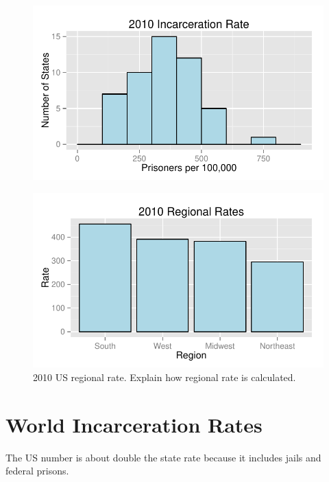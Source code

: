 \documentclass[letterpaper, landscape]{article}
\begin{document}
  \begin{figure}[H]
    \centering
    \includegraphics[scale = 0.8]{figures/rate_histogram_2010.pdf}
  \end{figure}

  \begin{figure}[H]
    \centering
    \includegraphics[scale = 0.8]{figures/regional_rates_2010.pdf}
    \caption{2010 US regional rate.  Explain how regional rate is calculated.}
  \end{figure}

  \section{World Incarceration Rates}

  The US number is about double the state rate because it includes jails and federal
  prisons.
\end{document}
